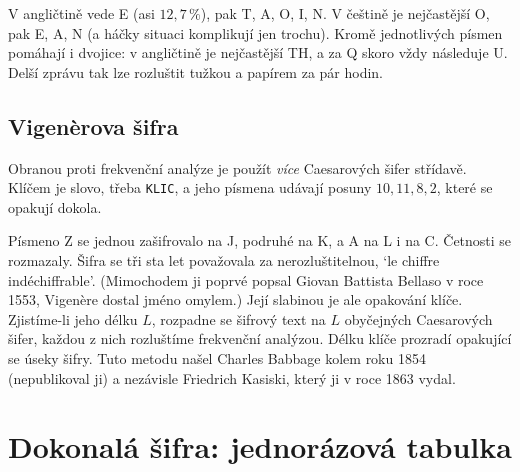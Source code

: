 V angličtině vede E (asi $12{,}7\,\%$), pak T, A, O, I, N. V češtině je nejčastější O, pak E, A, N (a háčky situaci komplikují jen trochu). Kromě jednotlivých písmen pomáhají i dvojice: v angličtině je nejčastější TH, a za Q skoro vždy následuje U. Delší zprávu tak lze rozluštit tužkou a papírem za pár hodin.

\subsection{Vigenèrova šifra}

Obranou proti frekvenční analýze je použít \textit{více} Caesarových šifer střídavě. Klíčem je slovo, třeba \texttt{KLIC}, a jeho písmena udávají posuny $10, 11, 8, 2$, které se opakují dokola.

\begin{center}
\end{center}

Písmeno Z se jednou zašifrovalo na J, podruhé na K, a A na L i na C. Četnosti se rozmazaly. Šifra se tři sta let považovala za nerozluštitelnou, `le chiffre indéchiffrable'. (Mimochodem ji poprvé popsal Giovan Battista Bellaso v roce 1553, Vigenère dostal jméno omylem.) Její slabinou je ale opakování klíče. Zjistíme-li jeho délku $L$, rozpadne se šifrový text na $L$ obyčejných Caesarových šifer, každou z nich rozluštíme frekvenční analýzou. Délku klíče prozradí opakující se úseky šifry. Tuto metodu našel Charles Babbage kolem roku 1854 (nepublikoval ji) a nezávisle Friedrich Kasiski, který ji v roce 1863 vydal.

\section{Dokonalá šifra: jednorázová tabulka}

